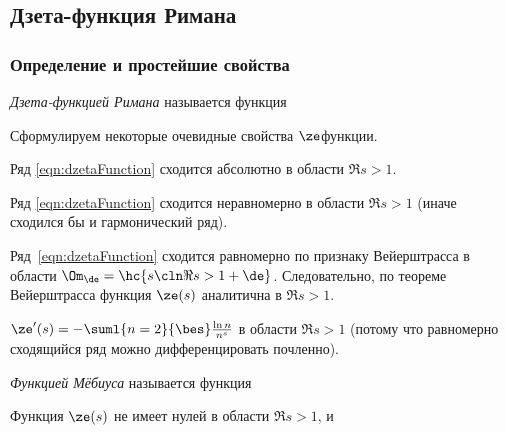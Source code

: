 \documentclass[a4paper]{article}
\begin{document}
\subsection{Дзета-функция Римана}

\subsubsection{Определение и простейшие свойства}

\begin{df}
\emph{Дзета-функцией Римана} называется функция
\end{df}

Сформулируем некоторые очевидные свойства $\ze$\д функции.

\begin{items}{-2}
\item Ряд \eqref{eqn:dzetaFunction} сходится абсолютно в области $\Re s>1$.
\item Ряд \eqref{eqn:dzetaFunction} сходится неравномерно в области $\Re s>1$ (иначе сходился бы и гармонический ряд).
\item Ряд~\eqref{eqn:dzetaFunction} сходится равномерно по признаку Вейерштрасса в области $\Om_\de=\hc{s\cln\Re s>1+\de}$.
      Следовательно, по теореме Вейерштрасса функция $\ze(s)$ аналитична в $\Re s>1$.
\item $\ze'(s)=-\suml{n=2}{\bes}\frac{\ln n}{n^s}$ в области $\Re s > 1$ (потому что равномерно сходящийся ряд
      можно дифференцировать почленно).
\end{items}


\begin{df} \emph{Функцией Мёбиуса} называется функция
\end{df}

\begin{stm}
Функция $\ze(s)$ не имеет нулей в области $\Re s>1$, и
\end{stm}
\end{document}
